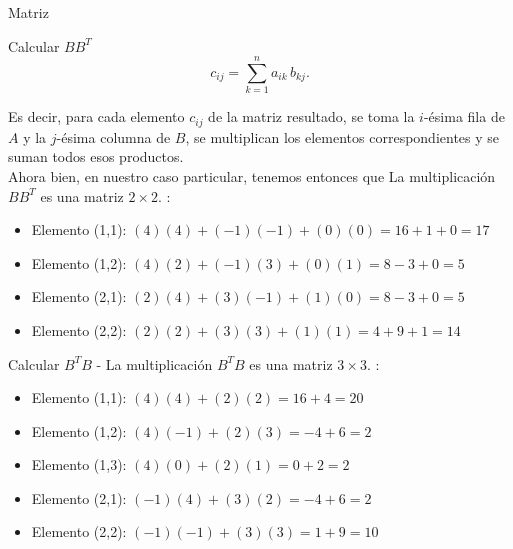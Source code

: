 \documentclass[11pt,letterpaper]{article}
\begin{document}
\begin{inciso}{Matriz}
\begin{problem}{Calcular \( BB^T \)}
\[
c_{ij} = \sum_{k=1}^{n} a_{ik} \, b_{kj}.
\]

Es decir, para cada elemento \( c_{ij} \) de la matriz resultado, se toma la \( i \)-ésima fila de \( A \) y la \( j \)-ésima columna de \( B \), se multiplican los elementos correspondientes y se suman todos esos productos.\\

Ahora bien, en nuestro caso particular, tenemos entonces que La multiplicación \( BB^T \) es una matriz \( 2 \times 2 \).  : 
\begin{itemize}
    \item Elemento (1,1):
    \( (4)(4) + (-1)(-1) + (0)(0) = 16 + 1 + 0 = 17 \)  
    
    \item Elemento (1,2): 
      \( (4)(2) + (-1)(3) + (0)(1) = 8 - 3 + 0 = 5 \)  
    
    \item Elemento (2,1): 
      \( (2)(4) + (3)(-1) + (1)(0) = 8 - 3 + 0 = 5 \)  
    
    \item Elemento (2,2): 
      \( (2)(2) + (3)(3) + (1)(1) = 4 + 9 + 1 = 14 \)
\end{itemize}

\begin{center}
\end{center}
    
\end{problem}

\begin{problem}{Calcular \( B^TB \)}
- La multiplicación \( B^TB \) es una matriz \( 3 \times 3 \).  :

\begin{itemize}
  \item  Elemento (1,1):  
    \( (4)(4) + (2)(2) = 16 + 4 = 20 \)  
  
  \item  Elemento (1,2):  
    \( (4)(-1) + (2)(3) = -4 + 6 = 2 \)  
  
  \item  Elemento (1,3):  
    \( (4)(0) + (2)(1) = 0 + 2 = 2 \)  
  
  \item  Elemento (2,1):  
    \( (-1)(4) + (3)(2) = -4 + 6 = 2 \)  
  
  \item  Elemento (2,2):  
    \( (-1)(-1) + (3)(3) = 1 + 9 = 10 \)  
  

\end{itemize}
\end{problem}
\end{inciso}
\end{document}
